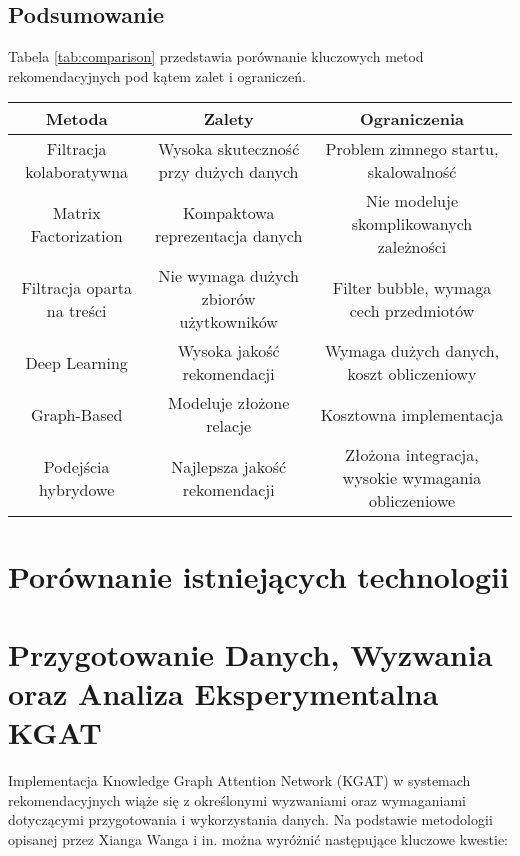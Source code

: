 \documentclass[a4paper,onecolumn]{LTJournalArticle}
\begin{document}
\subsection{Podsumowanie}
Tabela \ref{tab:comparison} przedstawia porównanie kluczowych metod rekomendacyjnych pod kątem zalet i ograniczeń.


\begin{table*}[t]
    \centering
    \begin{tabular}{|c|c|c|}
        \hline
        \textbf{Metoda} & \textbf{Zalety} & \textbf{Ograniczenia} \\
        \hline
        Filtracja kolaboratywna & Wysoka skuteczność przy dużych danych & Problem zimnego startu, skalowalność \\
        \hline
        Matrix Factorization & Kompaktowa reprezentacja danych & Nie modeluje skomplikowanych zależności \\
        \hline
        Filtracja oparta na treści & Nie wymaga dużych zbiorów użytkowników & Filter bubble, wymaga cech przedmiotów \\
        \hline
        Deep Learning & Wysoka jakość rekomendacji & Wymaga dużych danych, koszt obliczeniowy \\
        \hline
        Graph-Based & Modeluje złożone relacje & Kosztowna implementacja \\
        \hline
        Podejścia hybrydowe & Najlepsza jakość rekomendacji & Złożona integracja, wysokie wymagania obliczeniowe \\
        \hline
    \end{tabular}
    \caption{Porównanie metod rekomendacyjnych}
    \label{tab:comparison}
\end{table*}

\section{Porównanie istniejących technologii}
\section{Przygotowanie Danych, Wyzwania oraz Analiza Eksperymentalna KGAT}

Implementacja Knowledge Graph Attention Network (KGAT) w systemach rekomendacyjnych wiąże się z określonymi wyzwaniami oraz wymaganiami dotyczącymi przygotowania i wykorzystania danych. Na podstawie metodologii opisanej przez Xianga Wanga i in. \cite{wang2019kgat} można wyróżnić następujące kluczowe kwestie:
\end{document}
